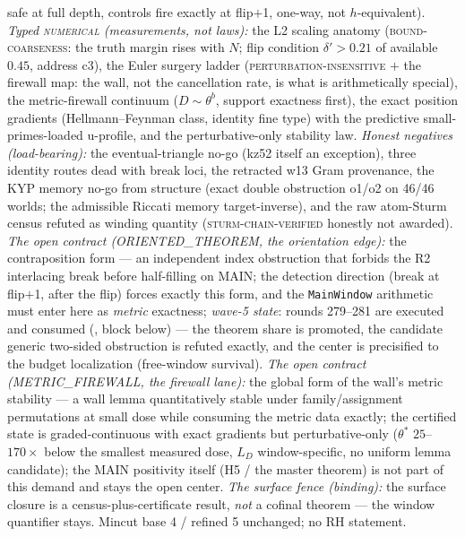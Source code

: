 {safe at full depth, controls fire exactly at flip$+$1, one-way,
not $h$-equivalent).  \emph{Typed \textsc{numerical}
(measurements, not laws):} the L2 scaling anatomy
(\textsc{bound-coarseness}: the truth margin rises with $N$; flip
condition $\delta' > 0.21$ of available $0.45$, address c3), the
Euler surgery ladder (\textsc{perturbation-insensitive} $+$ the
firewall map: the wall, not the cancellation rate, is what is
arithmetically special), the metric-firewall continuum
($D \sim \theta^b$, support exactness first), the exact position
gradients (Hellmann--Feynman class, identity fine type) with the
predictive small-primes-loaded u-profile, and the
perturbative-only stability law.  \emph{Honest negatives
(load-bearing):} the eventual-triangle no-go (kz52 itself an
exception), three identity routes dead with break loci, the
retracted w13 Gram provenance, the KYP memory no-go from
structure (exact double obstruction o1/o2 on 46/46 worlds; the
admissible Riccati memory target-inverse), and the raw atom-Sturm
census refuted as winding quantity
(\textsc{sturm-chain-verified} honestly not awarded).  \emph{The
open contract (ORIENTED\_THEOREM, the orientation edge):} the
contraposition form --- an independent index obstruction that
forbids the R2 interlacing break before half-filling on MAIN; the
detection direction (break at flip$+$1, after the flip) forces
exactly this form, and the \texttt{MainWindow} arithmetic must
enter here as \emph{metric} exactness; \emph{wave-5 state}:
rounds 279--281 are executed and consumed
(, block below) ---
the theorem share is promoted, the candidate generic two-sided
obstruction is refuted exactly, and the center is precisified to
the budget localization (free-window survival).  \emph{The open contract (METRIC\_FIREWALL, the
firewall lane):} the global form of the wall's metric stability
--- a wall lemma quantitatively stable under family/assignment
permutations at small dose while consuming the metric data
exactly; the certified state is graded-continuous with exact
gradients but perturbative-only ($\theta^*$ $25$--$170\times$
below the smallest measured dose, $L_D$ window-specific, no
uniform lemma candidate); the MAIN positivity itself (H5 / the
master theorem) is not part of this demand and stays the open
center.  \emph{The surface fence (binding):} the surface closure
is a census-plus-certificate result, \emph{not} a cofinal theorem
--- the window quantifier stays.  Mincut base 4 / refined 5
unchanged; no RH statement.\par}


